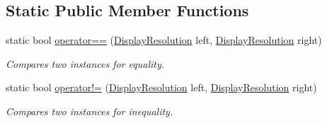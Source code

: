 \subsection*{Static Public Member Functions}
\begin{DoxyCompactItemize}
\item 
static bool \hyperlink{class_open_t_k_1_1_display_resolution_a990567856cafc1b26c90fd0278f609c9}{operator==} (\hyperlink{class_open_t_k_1_1_display_resolution}{Display\-Resolution} left, \hyperlink{class_open_t_k_1_1_display_resolution}{Display\-Resolution} right)
\begin{DoxyCompactList}\small\item\em Compares two instances for equality. \end{DoxyCompactList}\item 
static bool \hyperlink{class_open_t_k_1_1_display_resolution_a2217e412c56ba046f24ca7d221a438e3}{operator!=} (\hyperlink{class_open_t_k_1_1_display_resolution}{Display\-Resolution} left, \hyperlink{class_open_t_k_1_1_display_resolution}{Display\-Resolution} right)
\begin{DoxyCompactList}\small\item\em Compares two instances for inequality. \end{DoxyCompactList}\end{DoxyCompactItemize}
